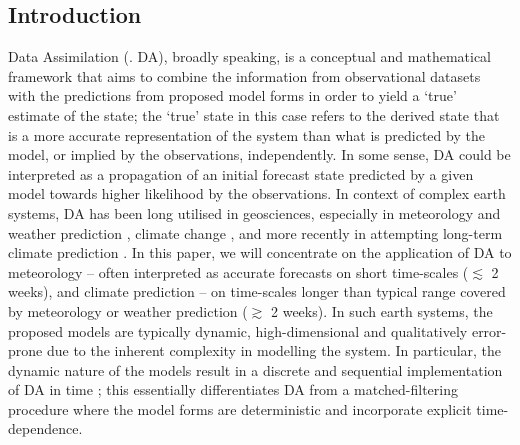 \documentclass[a4paper,10pt]{article}
\begin{document}
\begin{multicols}{2}
\section{Introduction}
\label{sec:intro}
Data Assimilation (. \textsf{DA}), broadly speaking, is a conceptual and mathematical framework that aims to combine the information from observational datasets with the predictions from proposed model forms in order to yield a `true' estimate of the state; the `true' state in this case refers to the derived state that is a more accurate representation of the system than what is predicted by the model, or implied by the observations, independently. In some sense, \textsf{DA} could be interpreted as a propagation of an initial forecast state predicted by a given model towards higher likelihood by  the observations. In context of complex earth systems, \textsf{DA} has been long utilised in geosciences, especially in meteorology and weather prediction \citep{carrassi2018}, climate change \citep{hannart2016}, and more recently in attempting long-term climate prediction \citep{penny2019}.  In this paper, we will concentrate on the application of \textsf{DA} to meteorology -- often interpreted as accurate forecasts on short time-scales ($\lesssim$ 2 weeks), and climate prediction -- on time-scales longer than typical range covered by meteorology or weather prediction ($\gtrsim$ 2 weeks). In such earth systems, the proposed models are typically dynamic, high-dimensional and qualitatively error-prone due to the inherent complexity in modelling the system. In particular, the dynamic nature of the models result in a discrete and sequential implementation of \textsf{DA} in time \citep{carrassi2018}; this essentially differentiates \textsf{DA} from a matched-filtering procedure where the model forms are deterministic and incorporate explicit time-dependence. 


\end{multicols}
\end{document}
